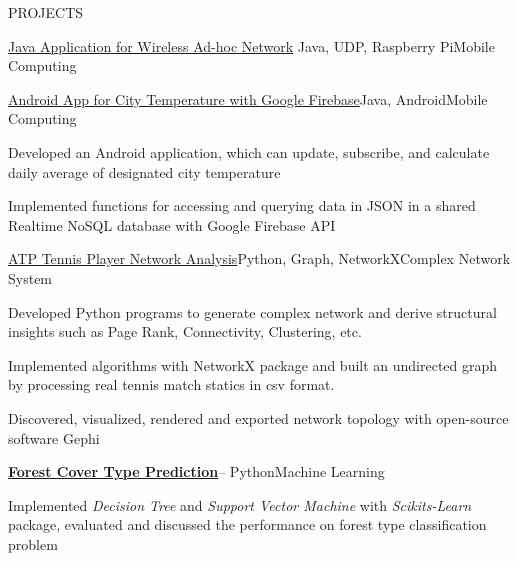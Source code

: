 \documentclass{resume} %
\begin{document}
\begin{rSection}{PROJECTS}
\begin{rSubsection}{\href{https://github.com/kuangyu0801/MobileComputing_SS20_assign04}{Java Application for Wireless Ad-hoc Network}} {Java, UDP, Raspberry Pi}{Mobile Computing}{}
\end{rSubsection}
\begin{rSubsection}{\href{https://github.com/kuangyu0801/MobileComputing_SS20_assign03}{Android App for City Temperature with Google Firebase}}{Java, Android}{Mobile Computing}{}
\item Developed an Android application, which can update, subscribe, and calculate daily average of designated city temperature
\item Implemented functions for accessing and querying  data in JSON in a shared Realtime NoSQL database  with Google Firebase API
\end{rSubsection}
\begin{rSubsection}{\href{https://github.com/kuangyu0801/WS19_ComplexNetworkSystem}{ATP Tennis Player Network Analysis}}{Python, Graph, NetworkX}{Complex Network System}{}
\item Developed Python programs to generate complex network and derive structural insights such as Page Rank, Connectivity, Clustering, etc.
\item Implemented algorithms with NetworkX package and built an undirected graph by processing real tennis match statics in csv format.
\item Discovered, visualized, rendered and exported network topology with open-source software Gephi
\end{rSubsection}

\begin{rSubsection}{\bf \href{https://1drv.ms/p/s!AiukWIzY5GZp22FjndnKscnEaL85?e=F2UJEL}{Forest Cover Type Prediction}}{-- Python}{Machine Learning}{}
\item Implemented {\em Decision Tree} and {\em Support Vector Machine} with {\em Scikits-Learn} package, evaluated and discussed the performance on forest type classification problem 

\end{rSubsection}

\end{rSection}


\end{document}
